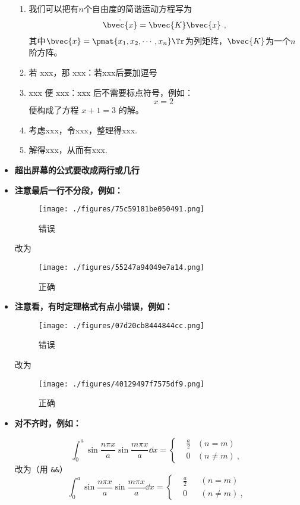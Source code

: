 \begin{itemize}
\begin{enumerate}
\item 
我们可以把有$n$个自由度的简谐运动方程写为
\begin{equation}
\ddot{\bvec{x}} = \bvec{K}\bvec{x}~,
\end{equation}
其中$\bvec{x}=\pmat{x_1, x_2, \cdots, x_n}\Tr$为列矩阵，$\bvec{K}$为一个$n$阶方阵。

\item 若 xxx，那 xxx：若xxx后要加逗号
\item xxx 便 xxx：xxx 后不需要标点符号，例如：
\begin{equation}
x=2~
\end{equation}
便构成了方程 $x+1=3$ 的解。
\item 考虑xxx，令xxx，整理得xxx.
\item 解得xxx，从而有xxx.
\end{enumerate}

\item \textbf{超出屏幕的公式要改成两行或几行}


\item \textbf{注意最后一行不分段，例如：}


\begin{figure}[ht]
\centering
\texttt{[image: ./figures/75c59181be050491.png]}
\caption{错误} \label{fig_WikPun}
\end{figure}
改为
\begin{figure}[ht]
\centering
\texttt{[image: ./figures/55247a94049e7a14.png]}
\caption{正确} \label{fig_WikPun1}
\end{figure}


\item \textbf{注意看，有时定理格式有点小错误，例如：}

\begin{figure}[ht]
\centering
\texttt{[image: ./figures/07d20cb8444844cc.png]}
\caption{错误} \label{fig_WikPun3}
\end{figure}
改为
\begin{figure}[ht]
\centering
\texttt{[image: ./figures/40129497f7575df9.png]}
\caption{正确} \label{fig_WikPun4}
\end{figure}


\item \textbf{对不齐时，例如：}

\begin{equation}
\int_0^a\sin\frac{n\pi x}{a}\sin\frac{m\pi x}{a}\dd x=\left\{\begin{aligned}
&\frac{a}{2}&(n=m)\\
& 0     &(n\neq m)~,
\end{aligned}\right.
\end{equation}
改为（用 \verb|&&|）
\begin{equation}
\int_0^a\sin\frac{n\pi x}{a}\sin\frac{m\pi x}{a}\dd x=\left\{\begin{aligned}
&\frac{a}{2}&&(n=m)\\
& 0     &&(n\neq m)~,
\end{aligned}\right.
\end{equation}
\end{itemize}
